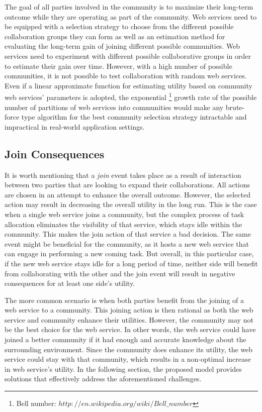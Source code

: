 The goal of all parties involved in the community is to maximize their long-term outcome while they are operating as part of the community. Web services need to be equipped with a selection strategy to choose from the different possible collaboration groups they can form as well as an estimation method for evaluating the long-term gain of joining different possible communities. Web services need to experiment with different possible collaborative groups in order to estimate their gain over time. However, with a high number of possible communities, it is not possible to test collaboration with random web services. Even if a linear approximate function for estimating utility based on community web services' parameters is adopted, the exponential \footnote{Bell number: $http://en.wikipedia.org/wiki/Bell\_number$} growth rate of the possible number of partitions of web services into communities would make any brute-force type algorithm for the best community selection strategy intractable and impractical in real-world application settings.

\subsection{Join Consequences}\label{s:jc}
It is worth mentioning that a \emph{join} event takes place as a result of interaction between two parties that are looking to expand their collaborations. All actions are chosen in an attempt to enhance the overall outcome. However, the selected action may result in decreasing the overall utility in the long run.
This is the case when a single web service joins a community, but the complex process of task allocation eliminates the visibility of that service, which stays idle within the community. This makes the join action of that service a bad decision. The same event might be beneficial for the community, as it hosts a new web service that can engage in performing a new coming task. But overall, in this particular case, if the new web service stays idle for a long period of time, neither side will benefit from collaborating with the other and the join event will result in negative consequences for at least one side's utility.

The more common scenario is when both parties benefit from the joining of a web service to a community. This joining action is then rational as both the web service and community enhance their utilities. However, the community may not be the best choice for the web service. In other words, the web service could have joined a better community if it had enough and accurate knowledge about the surrounding environment. Since the community does enhance its utility, the web service could stay with that community, which results in a non-optimal increase in web service's utility. In the following section, the proposed model provides solutions that effectively address the aforementioned challenges.

